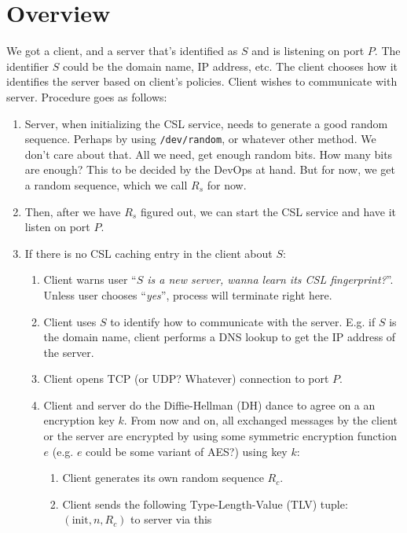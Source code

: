 \documentclass{article}
\begin{document}
\section{Overview}
We got a client, and a server that's identified as $S$  and is listening on
port $P$. The identifier $S$ could be the domain name, IP address, etc. The
client chooses how it identifies the server based on client's policies. Client
wishes to communicate with server. Procedure goes as follows:
\begin{enumerate}
    \item Server, when initializing the CSL service, needs to generate a good
    random sequence. Perhaps by using \texttt{/dev/random}, or whatever other
    method. We don't care about that. All we need, get enough random bits. How
    many bits are enough? This to be decided by the DevOps at hand. But for
    now, we get a random sequence, which we call $R_s$ for now.
    \item Then, after we have $R_s$ figured out, we can start the CSL service
    and have it listen on port $P$.
    \item If there is no CSL caching entry in the client about $S$:
        \begin{enumerate}
            \item Client warns user ``\emph{$S$ is a new server, wanna learn
            its CSL fingerprint?}''. Unless user chooses ``\emph{yes}'',
            process will terminate right here.
            \item Client uses $S$ to identify how to communicate with the
            server. E.g.  if $S$ is the domain name, client performs a DNS
            lookup to get the IP address of the server.
            \item Client opens TCP (or UDP? Whatever) connection to port $P$.
            \item Client and server do the Diffie-Hellman (DH) dance to agree
            on a an encryption key $k$. From now and on, all exchanged messages
            by the client or the server are encrypted by using some symmetric
            encryption function $e$ (e.g. $e$ could be some variant of AES?)
            using key $k$:
                \begin{enumerate}
                    \item Client generates its own random sequence $R_c$.
                    \item Client sends the following Type-Length-Value (TLV)
                    tuple: $(\text{init}, n, R_c)$ to server via this

\end{enumerate}
\end{enumerate}
\end{enumerate}
\end{document}
